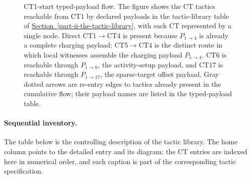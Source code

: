 \documentclass[
  11pt,
]{article}
\theoremstyle{definition}
\newcommand{\secref}[1]{\hyperref[#1]{Section~\ref*{#1}}}
\begin{document}
\begin{figure}[p]
{%
}
\caption[CT1-start typed-payload flow]{CT1-start typed-payload flow.  The figure shows the CT tactics reachable from CT1 by declared payloads in the tactic-library table of \secref{part-ii-the-tactic-library}, with each CT represented by a single node.  Direct CT1\(\to\)CT4 is present because \(P_{1\to4}\) is already a complete charging payload; CT5\(\to\)CT4 is the distinct route in which local witnesses assemble the charging payload \(P_{5\to4}\).  CT6 is reachable through \(P_{1\to6}\), the activity-setup payload, and CT17 is reachable through \(P_{1\to17}\), the sparse-target offset payload.  Gray dotted arrows are re-entry edges to tactics already present in the cumulative flow; their payload names are listed in the typed-payload table.}
\label{fig:ct1-continuation-flow}
\end{figure}

\clearpage


\paragraph{Sequential inventory.}
The table below is the controlling description of the tactic
library.  The home column points to the detailed entry and its diagram;
the CT entries are indexed here in numerical order, and each caption is
part of the corresponding tactic specification.
\end{document}
